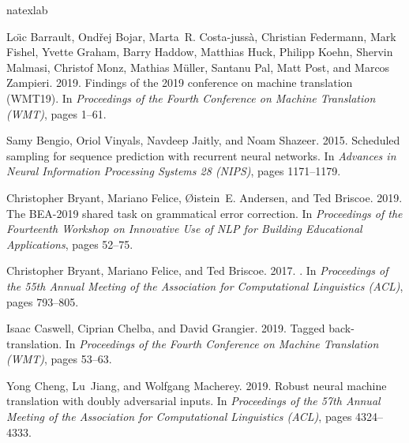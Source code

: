 \documentclass[11pt]{article}
\begin{document}

\begin{thebibliography}{47}
\expandafter\ifx\csname natexlab\endcsname\relax\def\natexlab#1{#1}\fi

Lo{\"\i}c Barrault, Ond{\v{r}}ej Bojar, Marta~R. Costa-juss{\`a}, Christian
  Federmann, Mark Fishel, Yvette Graham, Barry Haddow, Matthias Huck, Philipp
  Koehn, Shervin Malmasi, Christof Monz, Mathias M{\"u}ller, Santanu Pal, Matt
  Post, and Marcos Zampieri. 2019.
\newblock Findings of the 2019 conference on machine translation ({WMT}19).
\newblock In \emph{Proceedings of the Fourth Conference on Machine Translation
  (WMT)}, pages 1--61.

Samy Bengio, Oriol Vinyals, Navdeep Jaitly, and Noam Shazeer. 2015.
\newblock Scheduled sampling for sequence prediction with recurrent neural
  networks.
\newblock In \emph{Advances in Neural Information Processing Systems 28
  (NIPS)}, pages 1171--1179.

Christopher Bryant, Mariano Felice, {\O}istein~E. Andersen, and Ted Briscoe.
  2019.
\newblock The {BEA}-2019 shared task on grammatical error correction.
\newblock In \emph{Proceedings of the Fourteenth Workshop on Innovative Use of
  NLP for Building Educational Applications}, pages 52--75.

Christopher Bryant, Mariano Felice, and Ted Briscoe. 2017.
.
\newblock In \emph{Proceedings of the 55th Annual Meeting of the Association
  for Computational Linguistics (ACL)}, pages 793--805.

Isaac Caswell, Ciprian Chelba, and David Grangier. 2019.
\newblock Tagged back-translation.
\newblock In \emph{Proceedings of the Fourth Conference on Machine Translation
  (WMT)}, pages 53--63.

Yong Cheng, Lu~Jiang, and Wolfgang Macherey. 2019.
\newblock Robust neural machine translation with doubly adversarial inputs.
\newblock In \emph{Proceedings of the 57th Annual Meeting of the Association
  for Computational Linguistics (ACL)}, pages 4324--4333.


\end{thebibliography}
\end{document}
